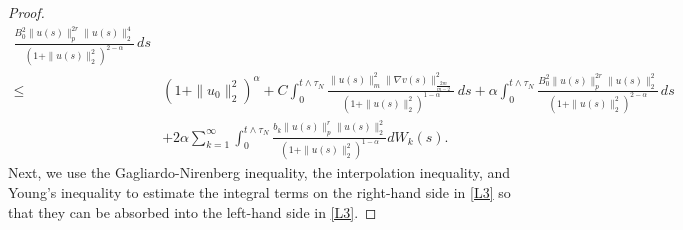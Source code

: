 \documentclass[reqno, 11pt]{amsart}
\theoremstyle{definition}
\numberwithin{equation}{section} \numberwithin{lem}{section}
\numberwithin{thm}{section} \numberwithin{prop}{section}
\numberwithin{cor}{section} \numberwithin{rem}{section}
\numberwithin{defn}{section}
\begin{document}
\begin{proof}
\begin{align}
		\frac{{B_0^2}\|u(s)\|_p^{2r}\|u(s)\|_2^4}
		{(1+\|u(s)\|_2^2)^{2-\alpha}}\,ds
		\nonumber\\
		\le&(1+\|u_0\|_2^2)^\alpha
		+C\int_0^{t\wedge{\tau_N}}
		\frac{\|u(s)\|_m^2\|\nabla v(s)\|_{\frac{2m}{m-2}}^2}
		{(1+\|u(s)\|_2^2)^{1-\alpha}}\,ds
		+\alpha\int_0^{t\wedge{\tau_N}}
		\frac{{B_0^2}\|u(s)\|_p^{2r}\|u(s)\|_2^2}
		{(1+\|u(s)\|_2^2)^{2-\alpha}}\,ds
		\nonumber\\
		&
+2\alpha\sum_{k=1}^\infty\int_0^{t\wedge{\tau_N}}
		\frac{b_k\|u(s)\|_p^r\|u(s)\|_2^2}
		{(1+\|u(s)\|_2^2)^{1-\alpha}}dW_k(s).
	\end{align}
    Next, we use the Gagliardo-Nirenberg inequality, the interpolation inequality, and Young's inequality to estimate the  integral terms on the right-hand side in \eqref{L3} so that they can be absorbed into the left-hand side in \eqref{L3}. 
    

\end{proof}
\end{document}
